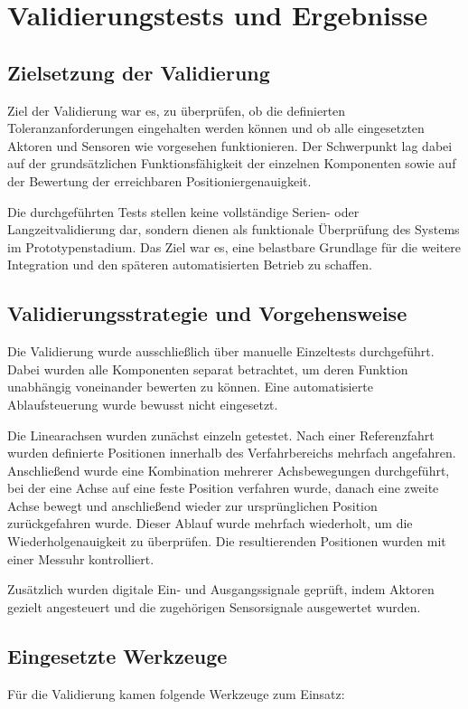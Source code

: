 \section{Validierungstests und Ergebnisse}
\subsection{Zielsetzung der Validierung}
Ziel der Validierung war es, zu überprüfen, ob die definierten Toleranzanforderungen eingehalten werden können und ob alle eingesetzten Aktoren und Sensoren wie vorgesehen funktionieren. Der Schwerpunkt lag dabei auf der grundsätzlichen Funktionsfähigkeit der einzelnen Komponenten sowie auf der Bewertung der erreichbaren Positioniergenauigkeit.

Die durchgeführten Tests stellen keine vollständige Serien- oder Langzeitvalidierung dar, sondern dienen als funktionale Überprüfung des Systems im Prototypenstadium. Das Ziel war es, eine belastbare Grundlage für die weitere Integration und den späteren automatisierten Betrieb zu schaffen.

\subsection{Validierungsstrategie und Vorgehensweise}
Die Validierung wurde ausschließlich über manuelle Einzeltests durchgeführt. Dabei wurden alle Komponenten separat betrachtet, um deren Funktion unabhängig voneinander bewerten zu können. Eine automatisierte Ablaufsteuerung wurde bewusst nicht eingesetzt.

Die Linearachsen wurden zunächst einzeln getestet. Nach einer Referenzfahrt wurden definierte Positionen innerhalb des Verfahrbereichs mehrfach angefahren. Anschließend wurde eine Kombination mehrerer Achsbewegungen durchgeführt, bei der eine Achse auf eine feste Position verfahren wurde, danach eine zweite Achse bewegt und anschließend wieder zur ursprünglichen Position zurückgefahren wurde. Dieser Ablauf wurde mehrfach wiederholt, um die Wiederholgenauigkeit zu überprüfen. Die resultierenden Positionen wurden mit einer Messuhr kontrolliert.

Zusätzlich wurden digitale Ein- und Ausgangssignale geprüft, indem Aktoren gezielt angesteuert und die zugehörigen Sensorsignale ausgewertet wurden.

\subsection{Eingesetzte Werkzeuge}
Für die Validierung kamen folgende Werkzeuge zum Einsatz:

